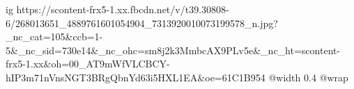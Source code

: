  
 
 
 
 

\ifcmt
  ig https://scontent-frx5-1.xx.fbcdn.net/v/t39.30808-6/268013651_4889761601054904_7313920010073199578_n.jpg?_nc_cat=105&ccb=1-5&_nc_sid=730e14&_nc_ohc=sm8j2k3MmbcAX9PLv5e&_nc_ht=scontent-frx5-1.xx&oh=00_AT9mWfVLCBCY-hIP3m71nVnsNGT3BRgQbnYd63i5HXL1EA&oe=61C1B954
  @width 0.4
  @wrap 
\fi

